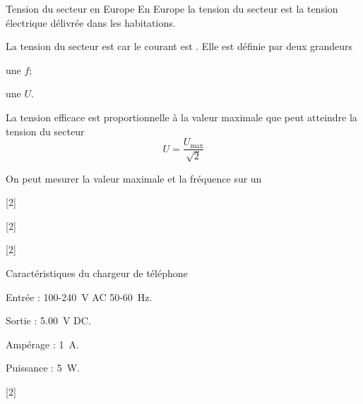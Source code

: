 \begin{doc}{Tension du secteur en Europe}
  En Europe la tension du secteur est la tension électrique délivrée dans les habitations.

  La tension du secteur est  car le courant est .
  Elle est définie par deux grandeurs 
  \begin{listePoints}
    \item une  $f$;
    \item une  $U$.
  \end{listePoints}

  La tension efficace est proportionnelle à la valeur maximale que peut atteindre la tension du secteur 
  \begin{equation*}
    U = \dfrac{U_\text{max}}{\sqrt{2}}
  \end{equation*}

  On peut mesurer la valeur maximale et la fréquence sur un 
\end{doc}

[2]

[2]

[2]


\begin{doc}{Caractéristiques du chargeur de téléphone}
  \begin{listePoints}[2]
    \item Entrée : 100-\qty{240}{\volt} AC 50-\qty{60}{\hertz}.
    \item Sortie : \qty{5,00}{\volt} DC.
    \item Ampérage : \qty{1}{\ampere}.
    \item Puissance : \qty{5}{\watt}.
  \end{listePoints}
\end{doc}

[2]
